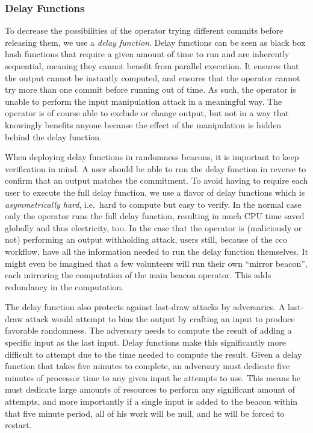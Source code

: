 \subsubsection{Delay Functions}
To decrease the possibilities of the operator trying different commits before releasing them, we use a \emph{delay function}.
Delay functions can be seen as black box hash functions that require a given amount of time to run and are inherently sequential, meaning they cannot benefit from parallel execution.
It ensures that the output cannot be instantly computed, and ensures that the operator cannot try more than one commit before running out of time.
As such, the operator is unable to perform the input manipulation attack in a meaningful way. The operator is of course able to exclude or change output, but not in a way that knowingly benefits anyone because the effect of the manipulation is hidden behind the delay function.

When deploying delay functions in randomness beacons, it is important to keep verification in mind.
A user should be able to run the delay function in reverse to confirm that an output matches the commitment.
To avoid having to require each user to execute the full delay function, we use a flavor of delay functions which is \emph{asymmetrically hard}, i.e.\ hard to compute but easy to verify.
In the normal case only the operator runs the full delay function, resulting in much CPU time saved globally and thus electricity, too.
In the case that the operator is (maliciously or not) performing an output withholding attack, users still, because of the \gls{cco} workflow, have all the information needed to run the delay function themselves.
It might even be imagined that a few volunteers will run their own \enquote{mirror beacon}, each mirroring the computation of the main beacon operator.
This adds redundancy in the computation.

The delay function also protects against last-draw attacks by adversaries.
A last-draw attack would attempt to bias the output by crafting an input to produce favorable randomness.
The adversary needs to compute the result of adding a specific input as the last input.
Delay functions make this significantly more difficult to attempt due to the time needed to compute the result.
Given a delay function that takes five minutes to complete, an adversary must dedicate five minutes of processor time to any given input he attempts to use.
This means he must dedicate large amounts of resources to perform any significant amount of attempts, and more importantly if a single input is added to the beacon within that five minute period, all of his work will be null, and he will be forced to restart.
